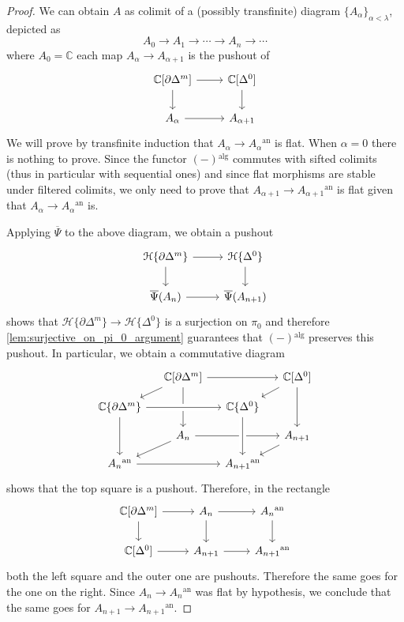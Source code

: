 \documentclass[12pt,a4paper,reqno]{amsart}
\theoremstyle{plain}
\theoremstyle{definition}
\theoremstyle{remark}
\numberwithin{equation}{section}
\begin{document}
\begin{proof}
	We can obtain $A$ as colimit of a (possibly transfinite) diagram $\{A_\alpha\}_{\alpha < \lambda}$, depicted as
	\[ A_0 \to A_1 \to \cdots \to A_n \to \cdots \]
	where $A_0 = \mathbb C$ each map $A_{\alpha} \to A_{\alpha+1}$ is the pushout of
	\[ \begin{tikzcd}
		\mathbb C[\partial \Delta^m] \arrow{r} \arrow{d} & \mathbb C[\Delta^0] \arrow{d} \\
		A_\alpha \arrow{r} & A_{\alpha+1} 
	\end{tikzcd} \]
	We will prove by transfinite induction that $A_\alpha \to A_\alpha{^\mathrm{an}}$ is flat. When $\alpha = 0$ there is nothing to prove.
	Since the functor $(-){^\mathrm{alg}}$ commutes with sifted colimits (thus in particular with sequential ones) and since flat morphisms are stable under filtered colimits, we only need to prove that $A_{\alpha+1} \to A_{\alpha +1}{^\mathrm{an}}$ is flat given that $A_\alpha \to A_\alpha{^\mathrm{an}}$ is.

	Applying $\overline{\Psi}$ to the above diagram, we obtain a pushout
	\[ \begin{tikzcd}
		{\mathcal H}\{\partial \Delta^m\} \arrow{r} \arrow{d} & {\mathcal H}\{\Delta^0\} \arrow{d} \\
		\overline{\Psi}(A_n) \arrow{r} & \overline{\Psi}(A_{n+1})
	\end{tikzcd} \]
	 shows that ${\mathcal H}\{\partial \Delta^m\} \to {\mathcal H}\{\Delta^0\}$ is a surjection on $\pi_0$ and therefore \cref{lem:surjective_on_pi_0_argument} guarantees that $(-){^\mathrm{alg}}$ preserves this pushout.
	{\ignorespaces}
	In particular, we obtain a commutative diagram
	\[ \begin{tikzcd}[column sep = small, row sep = small]
		{} & \mathbb C[\partial \Delta^m] \arrow{rr} \arrow{dd} \arrow{dl} & & \mathbb C[\Delta^0] \arrow{dd} \arrow{dl} \\
		\mathbb C\{\partial \Delta^m\} \arrow{dd} \arrow[crossing over]{rr} & & \mathbb C\{\Delta^0\} \\
		{} & A_n \arrow{rr} \arrow{dl} & & A_{n+1} \arrow{dl} \\
		A_n{^\mathrm{an}} \arrow{rr} & & A_{n+1}{^\mathrm{an}} \arrow[crossing over, leftarrow]{uu}
	\end{tikzcd} \]
	 shows that the top square is a pushout.
	Therefore, in the rectangle
	\[ \begin{tikzcd}
		\mathbb C[\partial \Delta^m] \arrow{r} \arrow{d} & A_n \arrow{r} \arrow{d} & A_n{^\mathrm{an}} \arrow{d} \\
		\mathbb C[\Delta^0] \arrow{r} & A_{n+1} \arrow{r} & A_{n+1}{^\mathrm{an}}
	\end{tikzcd} \]
	both the left square and the outer one are pushouts. Therefore the same goes for the one on the right.
	Since $A_n \to A_n{^\mathrm{an}}$ was flat by hypothesis, we conclude that the same goes for $A_{n+1} \to A_{n+1}{^\mathrm{an}}$.
\end{proof}
	
\end{document}
